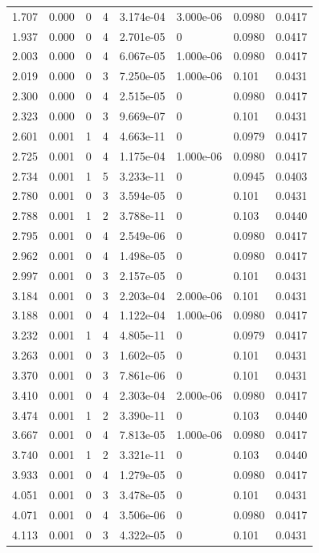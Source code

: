 \documentclass[preview]{standalone}
\begin{document}
{{\begin{tabular}{L{1.2cm}C{1.2cm} C{0.3cm}C{0.5cm} C{1.4cm}C{1.4cm} C{1.4cm}C{1.4cm}}
  1.707  &  0.000  & 0     &  4 &  3.174e-04  & 3.000e-06  & 0.0980 &  0.0417   \\ 
  1.937  &  0.000  & 0     &  4 &  2.701e-05  & 0  & 0.0980 &  0.0417   \\ 
  2.003  &  0.000  & 0     &  4 &  6.067e-05  & 1.000e-06  & 0.0980 &  0.0417   \\ 
  2.019  &  0.000  & 0     &  3 &  7.250e-05  & 1.000e-06  & 0.101 &  0.0431   \\ 
  2.300  &  0.000  & 0     &  4 &  2.515e-05  & 0  & 0.0980 &  0.0417   \\ 
  2.323  &  0.000  & 0     &  3 &  9.669e-07  & 0  & 0.101 &  0.0431   \\ 
  2.601  &  0.001  & 1     &  4 &  4.663e-11  & 0  & 0.0979 &  0.0417   \\ 
  2.725  &  0.001  & 0     &  4 &  1.175e-04  & 1.000e-06  & 0.0980 &  0.0417   \\ 
  2.734  &  0.001  & 1     &  5 &  3.233e-11  & 0  & 0.0945 &  0.0403   \\ 
  2.780  &  0.001  & 0     &  3 &  3.594e-05  & 0  & 0.101 &  0.0431   \\ 
  2.788  &  0.001  & 1     &  2 &  3.788e-11  & 0  & 0.103 &  0.0440   \\ 
  2.795  &  0.001  & 0     &  4 &  2.549e-06  & 0  & 0.0980 &  0.0417   \\ 
  2.962  &  0.001  & 0     &  4 &  1.498e-05  & 0  & 0.0980 &  0.0417   \\ 
  2.997  &  0.001  & 0     &  3 &  2.157e-05  & 0  & 0.101 &  0.0431   \\ 
  3.184  &  0.001  & 0     &  3 &  2.203e-04  & 2.000e-06  & 0.101 &  0.0431   \\ 
  3.188  &  0.001  & 0     &  4 &  1.122e-04  & 1.000e-06  & 0.0980 &  0.0417   \\ 
  3.232  &  0.001  & 1     &  4 &  4.805e-11  & 0  & 0.0979 &  0.0417   \\ 
  3.263  &  0.001  & 0     &  3 &  1.602e-05  & 0  & 0.101 &  0.0431   \\ 
  3.370  &  0.001  & 0     &  3 &  7.861e-06  & 0  & 0.101 &  0.0431   \\ 
  3.410  &  0.001  & 0     &  4 &  2.303e-04  & 2.000e-06  & 0.0980 &  0.0417   \\ 
  3.474  &  0.001  & 1     &  2 &  3.390e-11  & 0  & 0.103 &  0.0440   \\ 
  3.667  &  0.001  & 0     &  4 &  7.813e-05  & 1.000e-06  & 0.0980 &  0.0417   \\ 
  3.740  &  0.001  & 1     &  2 &  3.321e-11  & 0  & 0.103 &  0.0440   \\ 
  3.933  &  0.001  & 0     &  4 &  1.279e-05  & 0  & 0.0980 &  0.0417   \\ 
  4.051  &  0.001  & 0     &  3 &  3.478e-05  & 0  & 0.101 &  0.0431   \\ 
  4.071  &  0.001  & 0     &  4 &  3.506e-06  & 0  & 0.0980 &  0.0417   \\ 
  4.113  &  0.001  & 0     &  3 &  4.322e-05  & 0  & 0.101 &  0.0431   \\ 
\hline 
\end{tabular} 

}}
\end{document}
